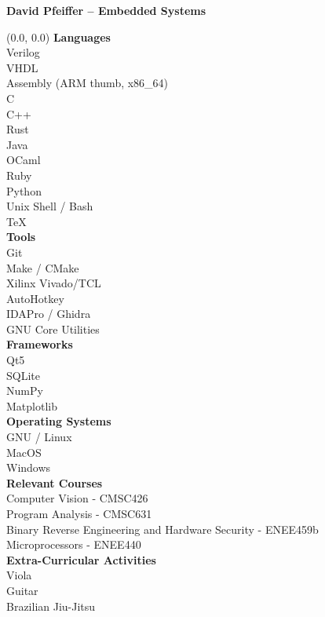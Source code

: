 \documentclass[10pt]{article}
\begin{document}

  \begin{center}
    \textbf{\Large David Pfeiffer -- Embedded Systems} \\
  \end{center}

  \begin{textblock}{0.3}(0.0, 0.0)
    \textbf{Languages} \\
    Verilog \\
    VHDL \\
    Assembly (ARM thumb, x86\_64) \\
    C \\
    C++ \\
    Rust \\
    Java \\
    OCaml \\
    Ruby \\
    Python \\
    Unix Shell / Bash \\
    TeX \\

    \textbf{Tools} \\
    Git \\
    Make / CMake \\
    Xilinx Vivado/TCL \\
    AutoHotkey \\
    IDAPro / Ghidra \\
    GNU Core Utilities \\

    \textbf{Frameworks} \\
    Qt5 \\
    SQLite \\
    NumPy \\
    Matplotlib \\

    \textbf{Operating Systems} \\
    GNU / Linux \\
    MacOS \\
    Windows \\

    \textbf{Relevant Courses} \\
    Computer Vision - CMSC426 \\
    Program Analysis - CMSC631 \\
    Binary Reverse Engineering and Hardware Security - ENEE459b \\
    Microprocessors - ENEE440 \\

    \textbf{Extra-Curricular Activities} \\
    Viola \\
    Guitar \\
    Brazilian Jiu-Jitsu \\
    \vspace{5cm}
  \end{textblock}
\end{document}
